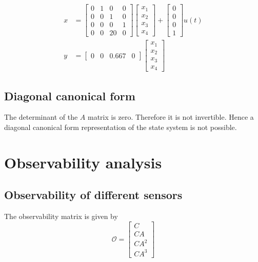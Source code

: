 \documentclass[12pt]{article}
\numberwithin{equation}{section}
\newcommand{\cO}{\mathcal{O}}
\begin{document}
\begin{align}
        x
    &=
    \begin{bmatrix}
        0 & 1 & 0 & 0\\
        0 & 0 & 1 & 0\\
        0 & 0 & 0 & 1\\
        0 & 0 & 20 & 0
    \end{bmatrix}
    \begin{bmatrix}
        x_1\\
        x_2\\
        x_3\\
        x_4
    \end{bmatrix}
    +
    \begin{bmatrix}
        0\\
        0\\
        0\\
        1
    \end{bmatrix}
    u(t)\\
    y
    &=
    \begin{bmatrix}
        0 & 0 & 0.667 & 0
    \end{bmatrix}
    \begin{bmatrix}
        x_1\\
        x_2\\
        x_3\\
        x_4
    \end{bmatrix}
\end{align}

\subsection{Diagonal canonical form}

The determinant of the $A$ matrix is zero. Therefore it is not invertible. Hence a diagonal canonical form representation of the state system is not possible.

\section{Observability analysis}

\subsection{Observability of different sensors}

The observability matrix is given by
\begin{equation}
    \cO
    =
    \begin{bmatrix}
        C\\
        C A\\
        C A^2\\
        C A^3
    \end{bmatrix}
\end{equation}
\end{document}
